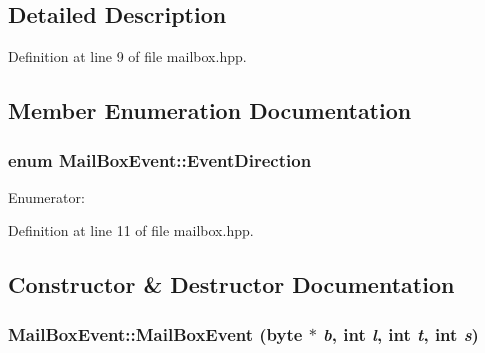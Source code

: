 \subsection{Detailed Description}


Definition at line 9 of file mailbox.hpp.

\subsection{Member Enumeration Documentation}
\hypertarget{struct_mail_box_event_a6c002ae6d74d407ec5b7a4a59dc6fbec}{
\subsubsection[{EventDirection}]{\setlength{\rightskip}{0pt plus 5cm}enum {\bf MailBoxEvent::EventDirection}}}
\label{struct_mail_box_event_a6c002ae6d74d407ec5b7a4a59dc6fbec}
\begin{Desc}
\item[Enumerator: ]\par
\begin{description}
\item[{\em 
\hypertarget{struct_mail_box_event_a6c002ae6d74d407ec5b7a4a59dc6fbeca529850a3716905f03cbc5ca10da7885a}{
Received}
\label{struct_mail_box_event_a6c002ae6d74d407ec5b7a4a59dc6fbeca529850a3716905f03cbc5ca10da7885a}
}]\item[{\em 
\hypertarget{struct_mail_box_event_a6c002ae6d74d407ec5b7a4a59dc6fbeca2a4d4b0717a4d028e8e9ceadb33d9281}{
Sent}
\label{struct_mail_box_event_a6c002ae6d74d407ec5b7a4a59dc6fbeca2a4d4b0717a4d028e8e9ceadb33d9281}
}]\end{description}
\end{Desc}



Definition at line 11 of file mailbox.hpp.

\subsection{Constructor \& Destructor Documentation}
\hypertarget{struct_mail_box_event_a187ea286cc518a6840118ef2298fd62c}{
\subsubsection[{MailBoxEvent}]{\setlength{\rightskip}{0pt plus 5cm}MailBoxEvent::MailBoxEvent ({\bf byte} $\ast$ {\em b}, \/  int {\em l}, \/  int {\em t}, \/  int {\em s})}}
\label{struct_mail_box_event_a187ea286cc518a6840118ef2298fd62c}


